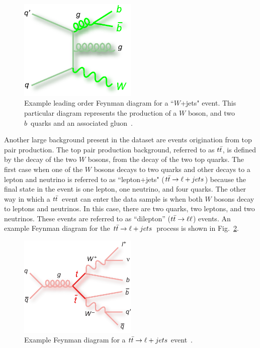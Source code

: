 \begin{figure}[!h!tbp]
\begin{center}
\includegraphics[width=0.5\textwidth]{eps/Feynman/feynman_Wbbg.eps}
\end{center}
\vspace{-0.1in}
\caption{Example leading order Feynman diagram for a ``$W$+jets" event. This particular diagram represents the production of a $W$ boson, and two $b$~quarks and an associated gluon~\cite{feynmandiagrams}.}
\label{wjetsexample}
\end{figure}

Another large background present in the dataset are events origination from top pair production. The top pair production background, referred to as $\mbox{$t\bar{t}$}$, is defined by the decay of the two $W$ bosons, from the decay of the two top quarks. The first case when one of the $W$ bosons decays to two quarks and other decays to a lepton and neutrino is referred to as ``lepton+jets" ($\mbox{$t\bar{t}$} \rightarrow \ell + jets$) because the final state in the event is one lepton, one neutrino, and four quarks. The other way in which a $\mbox{$t\bar{t}$}$~event can enter the data sample is when both $W$ bosons decay to leptons and neutrinos. In this case, there are two quarks, two leptons, and two neutrinos. These events are referred to as ``dilepton'' ($\mbox{$t\bar{t}$} \rightarrow \ell \ell$) events. An example Feynman diagram for the $\mbox{$t\bar{t}$} \rightarrow \ell + jets$~process is shown in Fig.~\ref{ttbarexample}.

\begin{figure}[!h!tbp]
\begin{center}
\includegraphics[width=0.5\textwidth]{eps/Feynman/feynman_ttbar_ljets.eps}
\end{center}
\vspace{-0.1in}
\caption{Example Feynman diagram for a $\mbox{$t\bar{t}$} \rightarrow \ell + jets$ event~\cite{feynmandiagrams}.}
\label{ttbarexample}
\end{figure}

